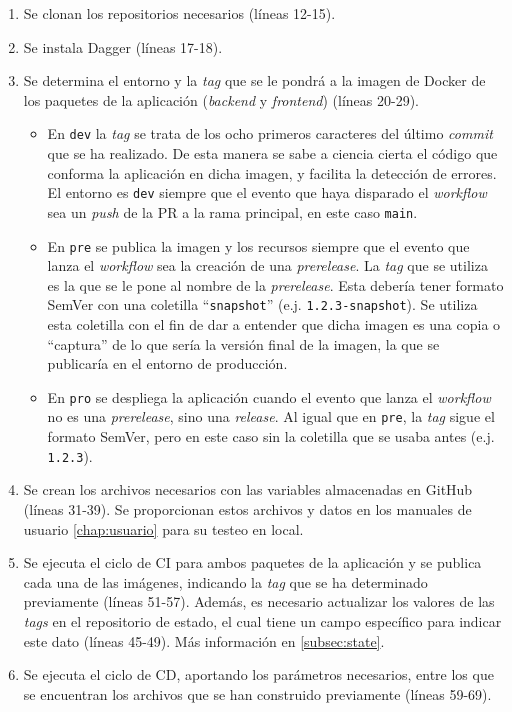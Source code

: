 \begin{enumerate}
  \item Se clonan los repositorios necesarios (líneas 12-15).
  \item Se instala Dagger (líneas 17-18).
  \item Se determina el entorno y la \textit{tag} que se le pondrá a la imagen de Docker de los paquetes de la aplicación (\textit{backend} y \textit{frontend}) (líneas 20-29).
    \begin{itemize}
      \item En \texttt{dev} la \textit{tag} se trata de los ocho primeros caracteres del último \textit{commit} que se ha realizado. De esta manera se sabe a ciencia cierta el código que conforma la aplicación en dicha imagen, y facilita la detección de errores. El entorno es \texttt{dev} siempre que el evento que haya disparado el \textit{workflow} sea un \textit{push} de la PR a la rama principal, en este caso \texttt{main}.
      \item En \texttt{pre} se publica la imagen y los recursos siempre que el evento que lanza el \textit{workflow} sea la creación de una \textit{prerelease}. La \textit{tag} que se utiliza es la que se le pone al nombre de la \textit{prerelease}. Esta debería tener formato SemVer\cite{semver} con una coletilla ``\texttt{snapshot}'' (e.j. \texttt{1.2.3-snapshot}). Se utiliza esta coletilla con el fin de dar a entender que dicha imagen es una copia o ``captura'' de lo que sería la versión final de la imagen, la que se publicaría en el entorno de producción.
      \item En \texttt{pro} se despliega la aplicación cuando el evento que lanza el \textit{workflow} no es una \textit{prerelease}, sino una \textit{release}. Al igual que en \texttt{pre}, la \textit{tag} sigue el formato SemVer, pero en este caso sin la coletilla que se usaba antes (e.j. \texttt{1.2.3}).
    \end{itemize}
     
  \item Se crean los archivos necesarios con las variables almacenadas en GitHub (líneas 31-39). Se proporcionan estos archivos y datos en los manuales de usuario \ref{chap:usuario} para su testeo en local.
  \item Se ejecuta el ciclo de CI para ambos paquetes de la aplicación y se publica cada una de las imágenes, indicando la \textit{tag} que se ha determinado previamente (líneas 51-57). Además, es necesario actualizar los valores de las \textit{tags} en el repositorio de estado, el cual tiene un campo específico para indicar este dato (líneas 45-49). Más información en \ref{subsec:state}.
  \item Se ejecuta el ciclo de CD, aportando los parámetros necesarios, entre los que se encuentran los archivos que se han construido previamente (líneas 59-69).
\end{enumerate}

